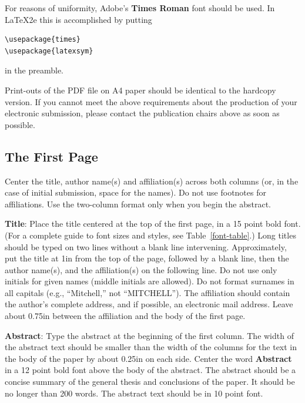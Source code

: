 \documentclass[11pt]{article}
\begin{document}
For reasons of uniformity, Adobe's {\bf Times Roman} font should be
used. In \LaTeX2e{} this is accomplished by putting
\small
\begin{verbatim}
\usepackage{times}
\usepackage{latexsym}
\end{verbatim}
\normalsize
in the preamble.


Print-outs of the PDF file on A4 paper should be identical to the
hardcopy version.  If you cannot meet the above requirements about the
production of your electronic submission, please contact the
publication chairs above  as soon as possible.


\subsection{The First Page}
\label{ssec:first}

Center the title, author name(s) and affiliation(s) across both
columns (or, in the case of initial submission, space for the names). 
Do not use footnotes for affiliations.  
Use the two-column format only when you begin the abstract.

{\bf Title}: Place the title centered at the top of the first page, in
a 15 point bold font.  (For a complete guide to font sizes and styles, see Table~\ref{font-table}.)
Long titles should be typed on two lines without
a blank line intervening. Approximately, put the title at 1in from the
top of the page, followed by a blank line, then the author name(s),
and the affiliation(s) on the following line.  Do not use only initials
for given names (middle initials are allowed). Do not format surnames
in all capitals (e.g., ``Mitchell,'' not ``MITCHELL'').  The affiliation should
contain the author's complete address, and if possible, an electronic
mail address. Leave about 0.75in between the affiliation and the body
of the first page.

{\bf Abstract}: Type the abstract at the beginning of the first
column.  The width of the abstract text should be smaller than the
width of the columns for the text in the body of the paper by about
0.25in on each side.  Center the word {\bf Abstract} in a 12 point
bold font above the body of the abstract. The abstract should be a
concise summary of the general thesis and conclusions of the paper.
It should be no longer than 200 words.  The abstract text should be in 10 point font.
\end{document}
